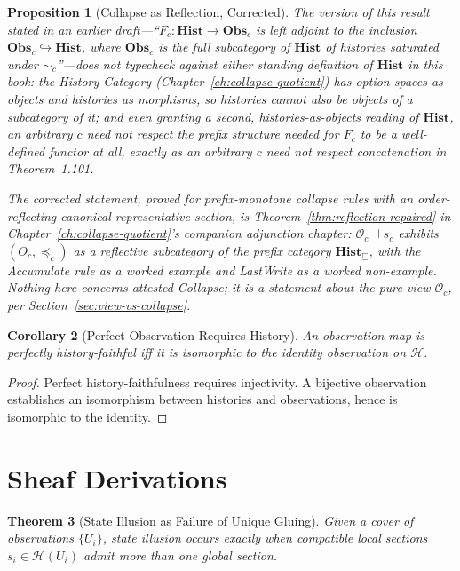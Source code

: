 \documentclass[12pt, a4paper, openany]{book}
\theoremstyle{plain}
\newtheorem{theorem}{Theorem}[chapter]
\newtheorem{proposition}[theorem]{Proposition}
\newtheorem{corollary}[theorem]{Corollary}
\theoremstyle{definition}
\theoremstyle{remark}
\newcommand{\Hist}{\mathbf{Hist}}
\newcommand{\Obs}{\mathbf{Obs}}
\newcommand{\calH}{\mathcal{H}}
\begin{document}
\begin{proposition}[Collapse as Reflection, Corrected]
The version of this result stated in an earlier draft---``$F_c : \Hist \to
\Obs_c$ is left adjoint to the inclusion $\Obs_c \hookrightarrow \Hist$, where
$\Obs_c$ is the full subcategory of $\Hist$ of histories saturated under
$\sim_c$''---does not typecheck against either standing definition of $\Hist$
in this book: the History Category (Chapter~\ref{ch:collapse-quotient}) has
option spaces as objects and histories as morphisms, so histories cannot also
be objects of a subcategory of it; and even granting a second, histories-as-objects
reading of $\Hist$, an arbitrary $c$ need not respect the prefix structure
needed for $F_c$ to be a well-defined functor at all, exactly as an arbitrary
$c$ need not respect concatenation in Theorem~1.101.

The corrected statement, proved for prefix-monotone collapse rules with an
order-reflecting canonical-representative section, is
Theorem~\ref{thm:reflection-repaired} in Chapter~\ref{ch:collapse-quotient}'s
companion adjunction chapter: $\mathcal{O}_c \dashv s_c$ exhibits $(O_c,
\preceq_c)$ as a reflective subcategory of the prefix category
$\Hist_\sqsubseteq$, with the Accumulate rule as a worked example and LastWrite
as a worked non-example. Nothing here concerns attested Collapse; it is a
statement about the pure view $\mathcal{O}_c$, per
Section~\ref{sec:view-vs-collapse}.
\end{proposition}

\begin{corollary}[Perfect Observation Requires History]
An observation map is perfectly history-faithful iff it is isomorphic to the
identity observation on $\calH$.
\end{corollary}

\begin{proof}
Perfect history-faithfulness requires injectivity. A bijective observation
establishes an isomorphism between histories and observations, hence is isomorphic
to the identity.
\end{proof}

\section{Sheaf Derivations}

\begin{theorem}[State Illusion as Failure of Unique Gluing]
Given a cover of observations $\{U_i\}$, state illusion occurs exactly when
compatible local sections $s_i \in \calH(U_i)$ admit more than one global
section.
\end{theorem}
\end{document}
